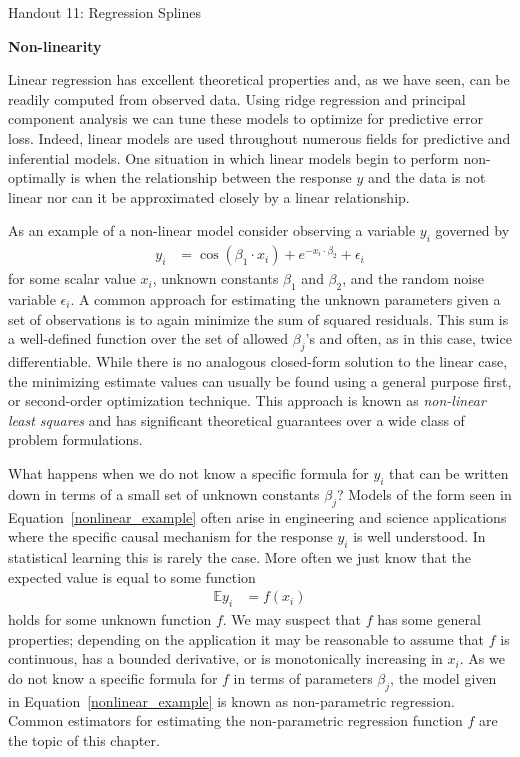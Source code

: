 \documentclass[12pt,hidelinks]{article}
\numberwithin{equation}{section}
\begin{document}
{\LARGE Handout 11: Regression Splines}

\vspace*{18pt}

\textbf{Non-linearity}

Linear regression has excellent theoretical properties and,
as we have seen, can be readily computed from observed data.
Using ridge regression and principal component analysis we
can tune these models to optimize for predictive error loss.
Indeed, linear models are used throughout numerous fields for
predictive and inferential models. One situation in which
linear models begin to perform non-optimally is when the
relationship between the response $y$ and the data is
not linear nor can it be approximated closely by a linear
relationship.

As an example of a non-linear model consider observing a
variable $y_i$ governed by
\begin{align}
y_i &= \cos(\beta_1 \cdot x_i) + e^{-x_i \cdot \beta_2} + \epsilon_i \label{nonlinear_example}
\end{align}
for some scalar value $x_i$, unknown constants $\beta_1$
and $\beta_2$, and the random noise variable $\epsilon_i$.
A common approach for estimating the unknown parameters given
a set of observations is to again minimize the sum of squared
residuals. This sum is a well-defined function over the set of
allowed $\beta_j$'s and often, as in this case, twice differentiable.
While there is no analogous closed-form solution to the linear
case, the minimizing estimate values can usually be found using
a general purpose first, or second-order optimization technique.
This approach is known as \textit{non-linear least squares} and
has significant theoretical guarantees over a wide class of
problem formulations. 

What happens when we do not know a specific formula for $y_i$
that can be written down in terms of a small set of unknown
constants $\beta_j$? Models of the form seen in Equation~\ref{nonlinear_example}
often arise in engineering and science applications where the
specific causal mechanism for the response $y_i$ is well
understood. In statistical learning this is rarely the case.
More often we just know that the expected value is equal to some function
\begin{align}
\mathbb{E} y_i &= f(x_i) \label{nonparam_def}
\end{align}
holds for some unknown function $f$. We may suspect that
$f$ has some general properties; depending on the application it may
be reasonable to assume that $f$ is continuous, has a bounded derivative,
or is monotonically increasing in $x_i$. As we do not know a specific
formula for $f$ in terms of parameters $\beta_j$, the model given in
Equation~\ref{nonlinear_example} is known as non-parametric regression.
Common estimators for estimating the non-parametric regression function
$f$ are the topic of this chapter.
\end{document}

